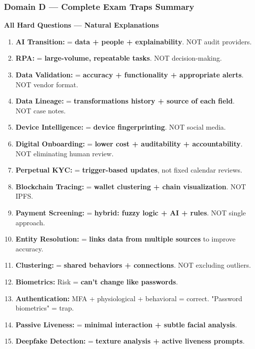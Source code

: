 \documentclass[12pt,aspectratio=169]{beamer}
\renewcommand{\scriptsize}{\fontsize{4.5}{5.5}\selectfont}
\begin{document}
	\begin{frame}
		\frametitle{\fontsize{11}{13}\selectfont \textbf{Domain D — Complete Exam Traps Summary}}
		\scriptsize
		\begin{block}{\fontsize{7}{9}\selectfont \textbf{All Hard Questions — Natural Explanations}}
			\scriptsize
			\begin{enumerate}
				\item \textbf{AI Transition:} = \textbf{data + people + explainability}. NOT audit providers.
				\item \textbf{RPA:} = \textbf{large-volume, repeatable tasks}. NOT decision-making.
				\item \textbf{Data Validation:} = \textbf{accuracy + functionality + appropriate alerts}. NOT vendor format.
				\item \textbf{Data Lineage:} = \textbf{transformations history + source of each field}. NOT case notes.
				\item \textbf{Device Intelligence:} = \textbf{device fingerprinting}. NOT social media.
				\item \textbf{Digital Onboarding:} = \textbf{lower cost + auditability + accountability}. NOT eliminating human review.
				\item \textbf{Perpetual KYC:} = \textbf{trigger-based updates}, not fixed calendar reviews.
				\item \textbf{Blockchain Tracing:} = \textbf{wallet clustering + chain visualization}. NOT IPFS.
				\item \textbf{Payment Screening:} = \textbf{hybrid: fuzzy logic + AI + rules}. NOT single approach.
				\item \textbf{Entity Resolution:} = \textbf{links data from multiple sources} to improve accuracy.
				\item \textbf{Clustering:} = \textbf{shared behaviors + connections}. NOT excluding outliers.
				\item \textbf{Biometrics:} Risk = \textbf{can't change like passwords}.
				\item \textbf{Authentication:} MFA + physiological + behavioral = correct. "Password biometrics" = trap.
				\item \textbf{Passive Liveness:} = \textbf{minimal interaction + subtle facial analysis}.
				\item \textbf{Deepfake Detection:} = \textbf{texture analysis + active liveness prompts}.

\end{enumerate}
\end{block}
\end{frame}
\end{document}
